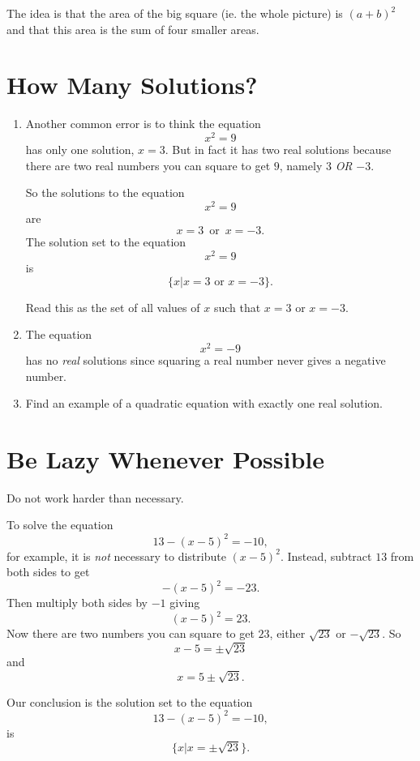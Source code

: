 \documentclass{ximera}
\begin{document}
The idea is that the area of the big square (ie. the whole picture) is $(a+b)^2$ and that this area is the sum of four smaller areas. 



\section{How Many Solutions?}
\begin{enumerate}
\item Another common error is to think the equation 
\[
    x^2 = 9
\]
has only one solution, $x=3$. But in fact it has two real solutions because there are two real numbers you can square to get $9$, namely $3$ \emph{OR} $-3$. 

So the solutions to the equation
\[
    x^2=9
\]
are
\[
   x = 3 \, \text{ or } \, x=-3.
\]
The solution set to the equation
\[
      x^2 = 9
\]
is 
\[
  \{ x | x = 3 \text{ or } x=-3 \} .
\]

Read this as the set of all values of $x$ such that $x=3$ or $x=-3$.

\item The equation 
\[
        x^2 = -9
\]
has no \emph{real} solutions since squaring a real number never gives a negative number.

\item Find an example of a quadratic equation with exactly one real solution.
\begin{freeResponse}
\end{freeResponse}

\end{enumerate}


\section{Be Lazy Whenever Possible}

Do not work harder than necessary. 

To solve the equation
\[
      13 - (x-5)^2 = -10,
\]
for example, it is \emph{not} necessary to distribute $(x-5)^2$. Instead, subtract $13$ from both sides to get
\[
    - (x-5)^2 = -23.
\] 
Then multiply both sides by $-1$ giving
\[
   (x-5)^2 = 23.
\]
Now there are two numbers you can square to get $23$, either $\sqrt{23}$ or $-\sqrt{23}$. So
\[
   x-5 = \pm \sqrt{23}
\]
and 
\[
   x = 5 \pm \sqrt{23}.
\]

Our conclusion is the solution set to the equation
\[
      13 - (x-5)^2 = -10,
\]
is
\[
   \{ x | x = \pm \sqrt{23} \} .
\]
\end{document}
